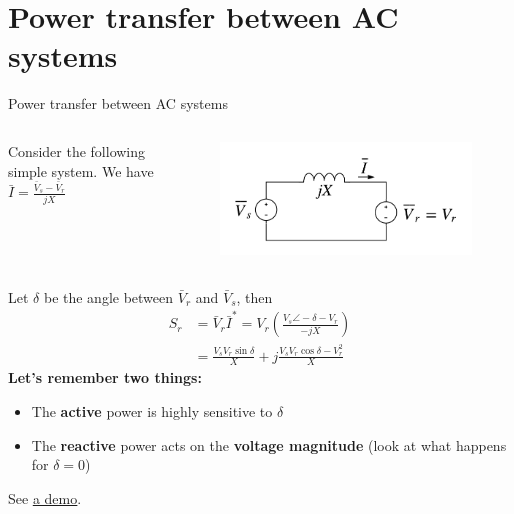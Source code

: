 \section{Power transfer between AC systems}
\begin{frame}[allowframebreaks]{Power transfer between AC systems}
    \begin{columns}
        \begin{column}{0.5\textwidth}
            Consider the following simple system. We have $\bar{I} = \frac{\bar{V}_s-\bar{V}_r}{jX}$
        \end{column}
        \begin{column}{0.5\textwidth}
            \begin{figure}
                \centering
                \includegraphics[width=\textwidth]{images/power-transfer_AC.png}
            \end{figure}
        \end{column}
    \end{columns}
    Let $\delta$ be the angle between $\bar{V}_r$ and $\bar{V}_s$, then
    $$
    \begin{aligned}
    S_r &= \bar{V}_r\bar{I}^* = V_r \left(\frac{V_s \angle -\delta - V_r}{-jX}\right) \\
         &= \frac{V_s V_r \sin \delta }{X} +j \frac{V_s V_r \cos \delta - V^2_r}{X}
    \end{aligned}
    $$
    \textbf{Let's remember two things:}
    \begin{itemize}
        \item The \textbf{active} power is highly sensitive to \textbf{$\delta$}
        \item The \textbf{reactive} power acts on the \textbf{voltage magnitude} (look at what happens for $\delta=0$)
    \end{itemize}

    See \href{https://colab.research.google.com/drive/1wrJYI082Y6qE6TyaT5a7eWO1lB0CCWiu?usp=sharing}{\underline{a demo}}.
\end{frame}


